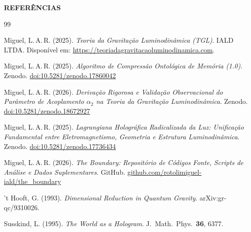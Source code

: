 \documentclass[12pt,a4paper,twoside]{article}
\begin{document}
\vspace{1cm}

%
%

\newpage
{}
\begin{center}
\vspace*{1cm}
{\huge\bfseries\color{tglblue} REFER\^ENCIAS}\\[1cm]
\end{center}

\begin{thebibliography}{99}

Miguel, L.\,A.\,R. (2025).
\textit{Teoria da Gravita\c{c}\~ao Luminodin\^amica (TGL)}.
IALD LTDA. Dispon\'ivel em: \url{https://teoriadagravitacaoluminodinamica.com}.

Miguel, L.\,A.\,R. (2025).
\textit{Algoritmo de Compress\~ao Ontol\'ogica de Mem\'oria (1.0)}.
Zenodo.
\href{https://doi.org/10.5281/zenodo.17860042}{doi:10.5281/zenodo.17860042}

Miguel, L.\,A.\,R. (2026).
\textit{Deriva\c{c}\~ao Rigorosa e Valida\c{c}\~ao Observacional do Par\^ametro de Acoplamento $\alpha_2$ na Teoria da Gravita\c{c}\~ao Luminodin\^amica}.
Zenodo.
\href{https://doi.org/10.5281/zenodo.18672927}{doi:10.5281/zenodo.18672927}

Miguel, L.\,A.\,R. (2025).
\textit{Lagrangiana Hologr\'afica Radicalizada da Luz: Unifica\c{c}\~ao Fundamental entre Eletromagnetismo, Geometria e Estrutura Luminodin\^amica}.
Zenodo.
\href{https://doi.org/10.5281/zenodo.17736434}{doi:10.5281/zenodo.17736434}

Miguel, L.\,A.\,R. (2026).
\textit{The Boundary: Reposit\'orio de C\'odigos Fonte, \textit{Scripts} de An\'alise e Dados Suplementares}.
GitHub.
\href{https://github.com/rotolimiguel-iald/the_boundary}{github.com/rotolimiguel-iald/the\_boundary}

't Hooft, G. (1993).
\textit{Dimensional Reduction in Quantum Gravity}.
arXiv:gr-qc/9310026.

Susskind, L. (1995).
\textit{The World as a Hologram}.
J.\ Math.\ Phys.\ \textbf{36}, 6377.


\end{thebibliography}
\end{document}
